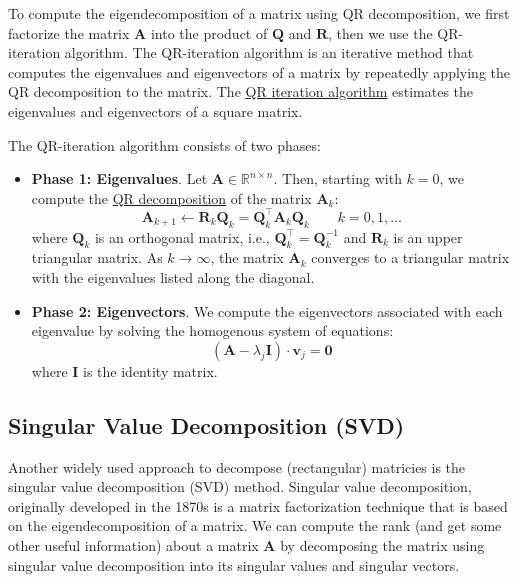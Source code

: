 \documentclass{article}[11pt]
\begin{document}
To compute the eigendecomposition of a matrix using QR decomposition, we first factorize the matrix $\mathbf{A}$ into the product of $\mathbf{Q}$ and $\mathbf{R}$, 
then we use the QR-iteration algorithm. The QR-iteration algorithm is an iterative method that computes the eigenvalues and eigenvectors of a matrix by repeatedly applying the QR decomposition to the matrix.
The \href{https://en.wikipedia.org/wiki/QR_algorithm}{QR iteration algorithm} estimates the eigenvalues and eigenvectors of a square matrix.
\begin{mdframed}
The QR-iteration algorithm consists of two phases:
\begin{itemize}[leftmargin=16pt]
\item{\textbf{Phase 1: Eigenvalues}. Let $\mathbf{A}\in\mathbb{R}^{n\times{n}}$. 
Then, starting with $k = 0$, we compute the \href{https://en.wikipedia.org/wiki/QR_decomposition}{QR decomposition} of the matrix $\mathbf{A}_{k}$:
\begin{equation*}
\mathbf{A}_{k+1}\leftarrow\mathbf{R}_{k}\mathbf{Q}_{k} = \mathbf{Q}_{k}^{\top}\mathbf{A}_{k}\mathbf{Q}_{k}\qquad{k=0,1,\dots} 
\end{equation*}
where $\mathbf{Q}_{k}$ is an orthogonal matrix, i.e., $\mathbf{Q}^{\top}_{k} = \mathbf{Q}^{-1}_{k}$ and $\mathbf{R}_{k}$ is an upper triangular matrix. 
As $k\rightarrow\infty$, the matrix $\mathbf{A}_{k}$ converges to a triangular matrix with the eigenvalues listed along the diagonal.}
\item{\textbf{Phase 2: Eigenvectors}. We compute the eigenvectors associated with each eigenvalue by solving the homogenous system of equations:
\begin{equation*}
\left(\mathbf{A}-\lambda_{j}\mathbf{I}\right)\cdot\mathbf{v}_{j} = \mathbf{0}
\end{equation*}
where $\mathbf{I}$ is the identity matrix.}
\end{itemize}
\end{mdframed}

\subsection{Singular Value Decomposition (SVD)}
Another widely used approach to decompose (rectangular) matricies is the singular value decomposition (SVD) method.
Singular value decomposition, originally developed in the 1870s \citep{Stewart:1993} is a matrix factorization technique that is based on the eigendecomposition of a matrix. We can compute the rank (and get some other useful information) about a matrix $\mathbf{A}$ by decomposing the matrix using singular value decomposition into its singular values and singular vectors.
\end{document}
